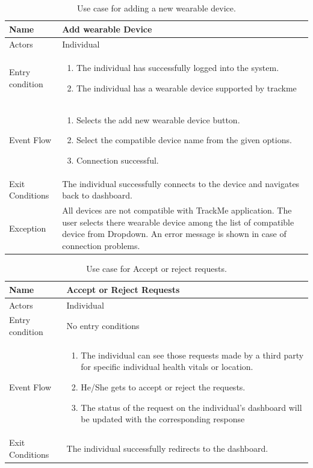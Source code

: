 \begin{table}[H]
\begin{tabular}{| l | p{} |}
\hline
Name & Add wearable Device\\
\hline
Actors & Individual\\
\hline
Entry condition & \begin{enumerate}
  \item The individual has successfully logged into the system.
  \item The individual has a wearable device supported by trackme
\end{enumerate}  \\
\hline
Event Flow & \begin{enumerate}
  \item Selects the add new wearable device button.
  \item Select the compatible device name from the given options.
  \item Connection successful.
\end{enumerate}
\\
\hline
Exit Conditions & The individual successfully connects to the device and navigates back to dashboard. \\
\hline
Exception & 
All devices are not compatible with TrackMe application. The user selects there wearable device among the list of compatible device from Dropdown. An error message is shown in case of connection problems.\\
\hline
\end{tabular}
\caption{Use case for adding a new wearable device.}
\label{usecase-adddevice}
\end{table}



\begin{table}[H]
\begin{tabular}{| l | p{} |}
\hline
Name & Accept or Reject Requests\\
\hline
Actors & Individual\\
\hline
Entry condition & No entry conditions\\
\hline
Event Flow & \begin{enumerate}
\item The individual can see those requests made by a third party for specific individual health vitals or location.
\item He/She gets to accept or reject the requests.
\item The status of the request on the individual's dashboard will be updated with the corresponding response
\end{enumerate}
\\
\hline
Exit Conditions & The individual successfully redirects to the dashboard.\\
\hline
\end{tabular}
\caption{Use case for Accept or reject requests.}
\label{usecase-accorrejrequests}
\end{table}

